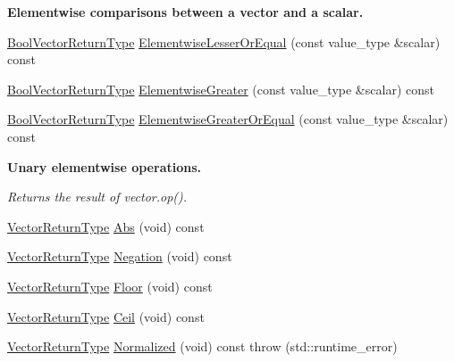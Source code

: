 \begin{Indent}{\bf Elementwise comparisons between a vector and a scalar.}
\begin{DoxyCompactItemize}
\item 
\hyperlink{classvct_dynamic_const_vector_base_a2de5b9c0f8c70782c548808d3ae4a453}{Bool\+Vector\+Return\+Type} \hyperlink{classvct_dynamic_const_vector_base_a02c097407f02ef1d7ecc563eb716fb57}{Elementwise\+Lesser\+Or\+Equal} (const value\+\_\+type \&scalar) const 
\item 
\hyperlink{classvct_dynamic_const_vector_base_a2de5b9c0f8c70782c548808d3ae4a453}{Bool\+Vector\+Return\+Type} \hyperlink{classvct_dynamic_const_vector_base_aa5cf7ffe8866f97679d2224d8521fdd5}{Elementwise\+Greater} (const value\+\_\+type \&scalar) const 
\item 
\hyperlink{classvct_dynamic_const_vector_base_a2de5b9c0f8c70782c548808d3ae4a453}{Bool\+Vector\+Return\+Type} \hyperlink{classvct_dynamic_const_vector_base_aa0bd700ae135ac76eda7da5d2357da8d}{Elementwise\+Greater\+Or\+Equal} (const value\+\_\+type \&scalar) const 
\end{DoxyCompactItemize}
\end{Indent}
\begin{Indent}{\bf Unary elementwise operations.}\par
{\em Returns the result of vector.\+op(). }\begin{DoxyCompactItemize}
\item 
\hyperlink{classvct_dynamic_const_vector_base_a379e4153bb82059072257410945bf83c}{Vector\+Return\+Type} \hyperlink{classvct_dynamic_const_vector_base_a47f29acb46067b8674743e970882b26e}{Abs} (void) const 
\item 
\hyperlink{classvct_dynamic_const_vector_base_a379e4153bb82059072257410945bf83c}{Vector\+Return\+Type} \hyperlink{classvct_dynamic_const_vector_base_a7823cc80941b6d69b8a5786efe54d7c5}{Negation} (void) const 
\item 
\hyperlink{classvct_dynamic_const_vector_base_a379e4153bb82059072257410945bf83c}{Vector\+Return\+Type} \hyperlink{classvct_dynamic_const_vector_base_a3e45bcc698dd60773ff26473c7431a27}{Floor} (void) const 
\item 
\hyperlink{classvct_dynamic_const_vector_base_a379e4153bb82059072257410945bf83c}{Vector\+Return\+Type} \hyperlink{classvct_dynamic_const_vector_base_a2c185194532e6977c62565af835fa6bf}{Ceil} (void) const 
\item 
\hyperlink{classvct_dynamic_const_vector_base_a379e4153bb82059072257410945bf83c}{Vector\+Return\+Type} \hyperlink{classvct_dynamic_const_vector_base_a5fde038e2d5eb0742783eef3580f446b}{Normalized} (void) const   throw (std\+::runtime\+\_\+error)
\end{DoxyCompactItemize}
\end{Indent}
